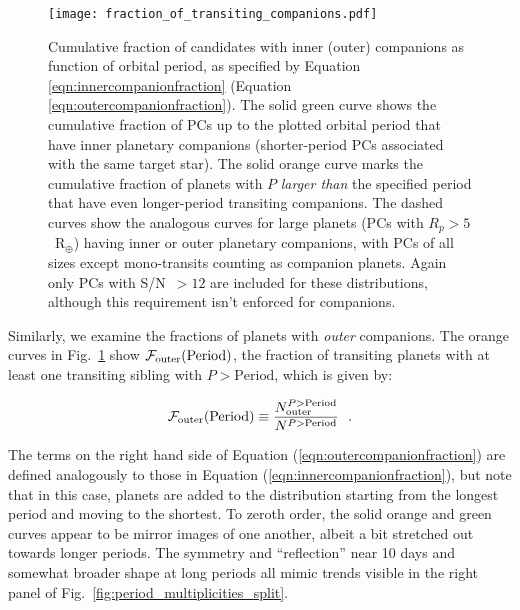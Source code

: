 \documentclass{aastex62}
\begin{document}
\begin{figure}[!hbt]
\centering
\texttt{[image: fraction\_of\_transiting\_companions.pdf]}
\caption{Cumulative fraction of candidates with inner (outer) companions as function of orbital period, as specified by Equation \ref{eqn:innercompanionfraction} (Equation \ref{eqn:outercompanionfraction}). The solid green curve shows the cumulative fraction of PCs up to the plotted orbital period that have inner planetary companions (shorter-period PCs associated with the same target star). The solid orange curve marks the cumulative fraction of planets with $P$ \emph{larger than} the specified period that have even longer-period transiting companions. The dashed curves show the analogous curves for large planets (PCs with $R_p > 5$~R$_\oplus$) having inner or outer planetary companions, with PCs of all sizes except mono-transits counting as companion planets. Again only PCs with S/N~$> 12$ are included for these distributions, although this requirement isn't enforced for companions.}%
\label{fig:neighbors}
\end{figure}

Similarly, we examine the fractions of planets with \emph{outer} companions. The orange curves in Fig.~\ref{fig:neighbors} show ${\cal F}_{\rm outer}(\textrm{Period})$, the fraction of transiting planets with at least one transiting sibling with $P>\textrm{Period}$, which is given by: 


\begin{equation}
{\cal F}_{\rm outer}(\textrm{Period}) \equiv \dfrac{N_{\rm outer}^{P>\textrm{Period}}}{N^{P>\textrm{Period}}} ~~. 
\label{eqn:outercompanionfraction}
\end{equation}


\noindent The terms on the right hand side of Equation (\ref{eqn:outercompanionfraction}) are defined analogously to those in Equation (\ref{eqn:innercompanionfraction}), but note that in this case, planets are added to the distribution starting from the longest period and moving to the shortest.  To zeroth order, the solid orange and green curves appear to be mirror images of one another, albeit a bit stretched out towards longer periods. The symmetry and ``reflection'' near 10 days and somewhat broader shape at long periods all mimic trends visible in the right panel of Fig.~\ref{fig:period_multiplicities_split}.
\end{document}
